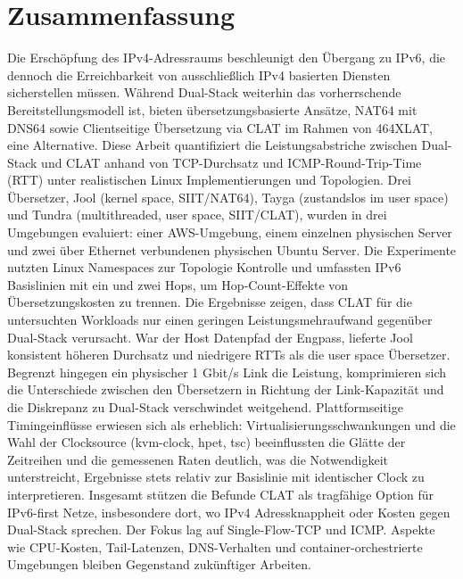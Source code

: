\section*{Zusammenfassung}

Die Erschöpfung des IPv4-Adressraums beschleunigt den Übergang zu IPv6, die dennoch die Erreichbarkeit von ausschließlich IPv4 basierten Diensten sicherstellen müssen. Während Dual-Stack weiterhin das vorherrschende Bereitstellungsmodell ist, bieten übersetzungsbasierte Ansätze, NAT64 mit DNS64 sowie Clientseitige Übersetzung via CLAT im Rahmen von 464XLAT, eine Alternative. Diese Arbeit quantifiziert die Leistungsabstriche zwischen Dual-Stack und CLAT anhand von TCP-Durchsatz und ICMP-Round-Trip-Time (RTT) unter realistischen Linux Implementierungen und Topologien. Drei Übersetzer, Jool (kernel space, SIIT/NAT64), Tayga (zustandslos im user space) und Tundra (multithreaded, user space, SIIT/CLAT), wurden in drei Umgebungen evaluiert: einer AWS-Umgebung, einem einzelnen physischen Server und zwei über Ethernet verbundenen physischen Ubuntu Server. Die Experimente nutzten Linux Namespaces zur Topologie Kontrolle und umfassten IPv6 Basislinien mit ein und zwei Hops, um Hop-Count-Effekte von Übersetzungskosten zu trennen.
Die Ergebnisse zeigen, dass CLAT für die untersuchten Workloads nur einen geringen Leistungsmehraufwand gegenüber Dual-Stack verursacht. War der Host Datenpfad der Engpass, lieferte Jool konsistent höheren Durchsatz und niedrigere RTTs als die user space Übersetzer. Begrenzt hingegen ein physischer 1 Gbit/s Link die Leistung, komprimieren sich die Unterschiede zwischen den Übersetzern in Richtung der Link-Kapazität und die Diskrepanz zu Dual-Stack verschwindet weitgehend. Plattformseitige Timingeinflüsse erwiesen sich als erheblich: Virtualisierungsschwankungen und die Wahl der Clocksource (kvm-clock, hpet, tsc) beeinflussten die Glätte der Zeitreihen und die gemessenen Raten deutlich, was die Notwendigkeit unterstreicht, Ergebnisse stets relativ zur Basislinie mit identischer Clock zu interpretieren. Insgesamt stützen die Befunde CLAT als tragfähige Option für IPv6-first Netze, insbesondere dort, wo IPv4 Adressknappheit oder Kosten gegen Dual-Stack sprechen. Der Fokus lag auf Single-Flow-TCP und ICMP. Aspekte wie CPU-Kosten, Tail-Latenzen, DNS-Verhalten und container-orchestrierte Umgebungen bleiben Gegenstand zukünftiger Arbeiten.
